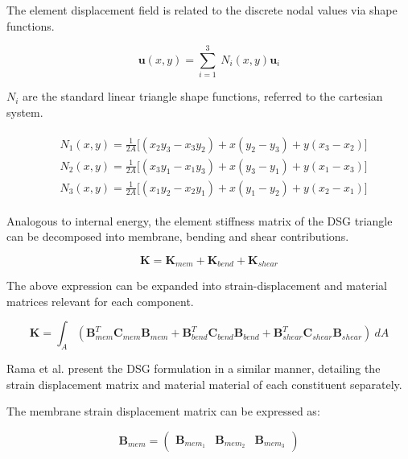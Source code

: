 The element displacement field is related to the discrete nodal values via shape functions.

\begin{equation} 
\mathbf{u}(x, y) = \sum_{i=1}^3 \ N_i(x,y) \mathbf{u}_i
\label{eqt2}
\end{equation}

$N_i$ are the standard linear triangle shape functions, referred to the cartesian system.


\begin{gather} 
	\begin{aligned}
		&N_1 (x , y) = \frac{1}{2 A} \big[ (x_2 y_3 - x_3 y_2) + x(y_2 - y_3) + y(x_3 - x_2) \big]
		\\
		&N_2 (x , y) = \frac{1}{2 A} \big[ (x_3 y_1 - x_1 y_3) + x(y_3 - y_1) + y(x_1 - x_3) \big]
		\\
		&N_3 (x , y) = \frac{1}{2 A} \big[ (x_1 y_2 - x_2 y_1) + x(y_1 - y_2) + y(x_2 - x_1) \big]
		\label{eqt3}
	\end{aligned}
\end{gather}

Analogous to internal energy, the element stiffness matrix of the DSG triangle can be decomposed into membrane, bending and shear contributions.

\begin{equation} 
\mathbf{K} = \mathbf{K}_{mem} + \mathbf{K}_{bend} + \mathbf{K}_{shear}
\label{eqt4}
\end{equation}

The above expression can be expanded into strain-displacement and material matrices relevant for each component.

\begin{equation} 
\mathbf{K} = \int_A  (\mathbf{B}_{mem}^T \mathbf{C}_{mem} \mathbf{B}_{mem} + \mathbf{B}_{bend}^T \mathbf{C}_{bend} \mathbf{B}_{bend} + \mathbf{B}_{shear}^T \mathbf{C}_{shear} \mathbf{B}_{shear})\ dA
\label{eqt5}
\end{equation}

Rama et al. \cite{Ram16} present the DSG formulation in a similar manner, detailing the strain displacement matrix and material material of each constituent separately.

The membrane strain displacement matrix can be expressed as:

\begin{equation} 
\mathbf{B}_{mem} =  \begin{pmatrix}
\mathbf{B}_{mem_1} & \mathbf{B}_{mem_2} & \mathbf{B}_{mem_3}
\end{pmatrix} 
\label{eqt6}
\end{equation}

